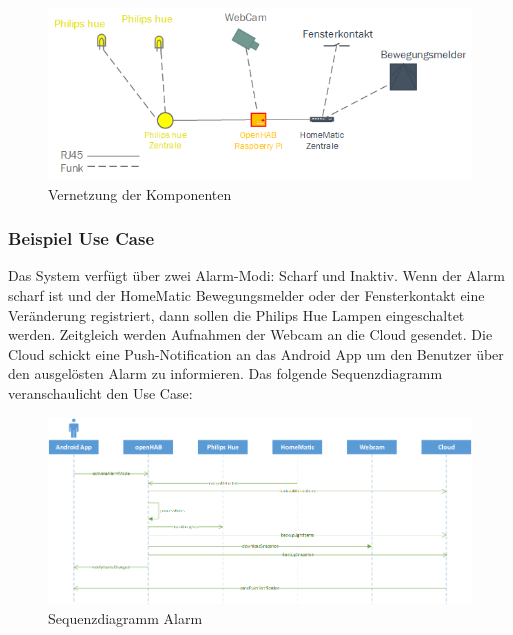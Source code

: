 \begin{figure}[H]
	\centering
		\includegraphics[scale=1]{report/img/vernetzung}
	\caption{Vernetzung der Komponenten}
	\label{fig:componentsIntegration}
\end{figure}

\subsubsection{Beispiel Use Case}
Das System verfügt über zwei Alarm-Modi: Scharf und Inaktiv. Wenn der Alarm scharf ist und der HomeMatic Bewegungsmelder oder der Fensterkontakt eine Veränderung registriert, dann sollen die Philips Hue Lampen eingeschaltet werden. Zeitgleich werden Aufnahmen der Webcam an die Cloud gesendet. Die Cloud schickt eine Push-Notification an das Android App um den Benutzer über den ausgelösten Alarm zu informieren. Das folgende Sequenzdiagramm veranschaulicht den Use Case:

\begin{figure}[H]
	\centering
		\includegraphics[width=\textwidth]{report/img/sequence_alarm.png}
	\caption{Sequenzdiagramm Alarm}
	\label{fig:sequenceAlarm}
\end{figure}


